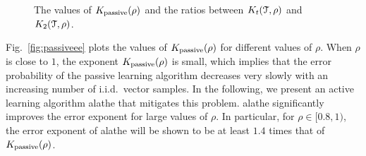 \begin{figure}[t] 
	\centering
	\centering
	\caption{The values of $K _{{\rm passive}}(\rho)$ and the ratios between $K_{t}(\mathcal{T},\rho)$ and $K_{2}(\mathcal{T},\rho)$.}
\end{figure}
	
Fig.~\ref{fig:passiveee} plots the values of $K _{{\rm passive}}(\rho)$ for different values of $\rho$. When $\rho$ 
is close to $1$, the  exponent $K_{{\rm passive}}(\rho)$ is small, which  implies that the error probability of the passive learning algorithm decreases very slowly with an increasing number of i.i.d.\ vector samples. In the following, we present an active learning algorithm \ac{alathe} that mitigates this problem.   \ac{alathe} significantly improves
the error exponent for large values of $\rho$. In particular, for $\rho\in[0.8,1)$, the error exponent of  \ac{alathe} will be shown to be at least $1.4$ times that of $K _{{\rm passive}}(\rho)$.


